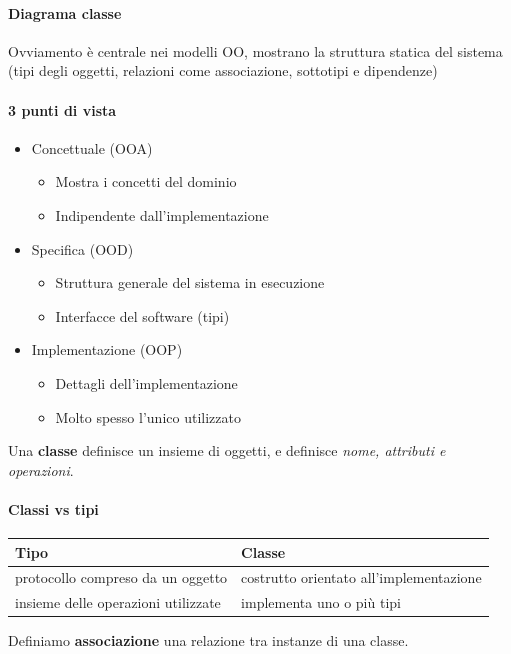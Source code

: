 \documentclass[a4paper,12pt]{article}
\begin{document}
\paragraph{Diagrama classe} Ovviamento è centrale nei modelli OO, mostrano la struttura statica del sistema (tipi degli oggetti, relazioni come associazione, sottotipi e dipendenze)\\
\paragraph{3 punti di vista}
\begin{itemize}
  \item Concettuale (OOA)
  \begin{itemize}
    \item Mostra i concetti del dominio
    \item Indipendente dall'implementazione
  \end{itemize}
  \item Specifica (OOD)
  \begin{itemize}
    \item Struttura generale del sistema in esecuzione
    \item Interfacce del software (tipi)
  \end{itemize}
  \item Implementazione (OOP)
  \begin{itemize}
    \item Dettagli dell'implementazione
    \item Molto spesso l'unico utilizzato
  \end{itemize}
\end{itemize}
Una \textbf{classe} definisce un insieme di oggetti, e definisce \textit{nome, attributi e operazioni}.
\paragraph{Classi vs tipi}
\begin{center}
\begin{tabular}{|p{}|p{}|}
\hline
\textbf{Tipo} & \textbf{Classe} \\
\hline
protocollo compreso da un oggetto
& costrutto orientato all'implementazione \\
\hline
insieme delle operazioni utilizzate
& implementa uno o più tipi \\
\hline
\end{tabular}
\end{center}
\vspace{1px}
Definiamo \textbf{associazione} una relazione tra instanze di una classe.
\end{document}
